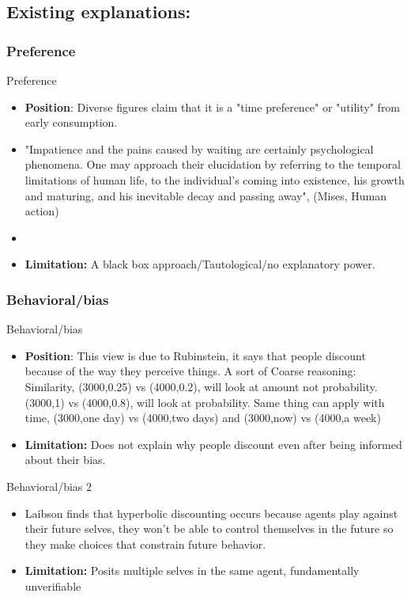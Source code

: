 \documentclass{beamer}
\numberwithin{equation}{section}
\begin{document}
\subsection{Existing explanations:}
\subsubsection{Preference}
\begin{frame}{Preference}
\begin{itemize}
    \item \textbf{Position}: Diverse figures claim that it is a "time preference" or "utility" from early consumption.
    \item "Impatience and the pains caused by waiting are certainly psychological phenomena. One may approach their elucidation by referring to the temporal limitations of human life, to the individual's coming into existence, his growth and maturing, and his inevitable decay and passing away", (Mises, Human action)
    \item 
    \item \textbf{Limitation:} A black box approach/Tautological/no explanatory power. 
\end{itemize}
\end{frame}

\subsubsection{Behavioral/bias}
\begin{frame}{Behavioral/bias}
\begin{itemize}
    \item \textbf{Position}: This view is due to Rubinstein, it says that people discount because of the way they perceive things. A sort of Coarse reasoning: Similarity, (3000,0.25) vs (4000,0.2), will look at amount not probability. (3000,1) vs (4000,0.8), will look at probability. Same thing can apply with time, (3000,one day) vs (4000,two days) and (3000,now) vs (4000,a week)
    \item \textbf{Limitation:} Does not explain why people discount even after being informed about their bias. 
\end{itemize}
\end{frame}

\begin{frame}{Behavioral/bias 2}
\begin{itemize}
    \item Laibson finds that hyperbolic discounting occurs because agents play against their future selves, they won't be able to control themselves in the future so they make choices that constrain future behavior. 
    \item \textbf{Limitation:} Posits multiple selves in the same agent, fundamentally unverifiable
\end{itemize}
\end{frame}
\end{document}
